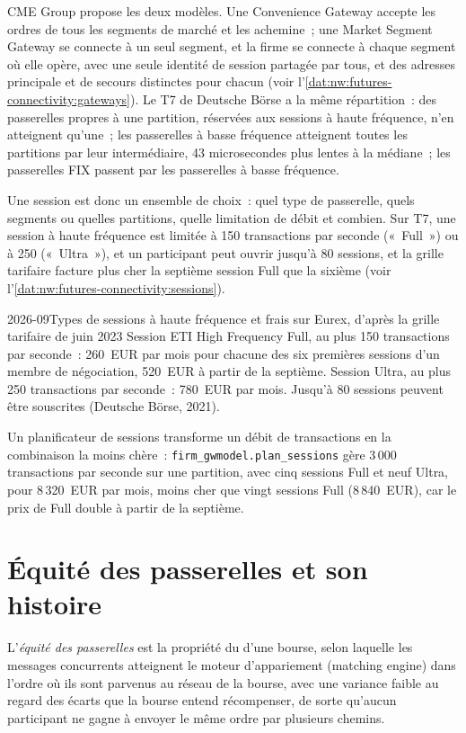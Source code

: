 CME Group propose les deux modèles. Une Convenience Gateway accepte les ordres de tous les segments de marché et les achemine~; une Market Segment
Gateway se connecte à un seul segment, et la firme se connecte à chaque segment où elle opère, avec une seule identité de session partagée par
  tous, et des adresses principale et de secours distinctes pour chacun (voir l'\cref{dat:nw:futures-connectivity:gateways}). Le T7 de Deutsche Börse
a la même répartition~: des passerelles propres à une partition, réservées aux sessions à haute fréquence, n'en atteignent qu'une~; les passerelles à basse fréquence
atteignent toutes les partitions par leur intermédiaire, 43 microsecondes plus lentes à la médiane~; les passerelles FIX passent par les passerelles à basse fréquence.

Une session est donc un ensemble de choix~: quel type de passerelle, quels segments ou quelles partitions, quelle limitation de débit et combien. Sur
T7, une session à haute fréquence est limitée à 150 transactions par seconde («~Full~») ou à 250 («~Ultra~»), et un participant peut ouvrir jusqu'à
80 sessions, et la grille tarifaire facture plus cher la septième session Full que la sixième
(voir l'\cref{dat:nw:futures-connectivity:sessions}).

\begin{dated}{2026-09}{Types de sessions à haute fréquence et frais sur Eurex, d'après la grille tarifaire de juin 2023}\label{dat:nw:futures-connectivity:sessions}
Session ETI High Frequency Full, au plus 150 transactions par seconde~: 260~EUR par mois pour chacune des six premières sessions
d'un membre de négociation, 520~EUR à partir de la septième. Session Ultra, au plus 250 transactions par seconde~: 780~EUR par mois. Jusqu'à 80 sessions peuvent être
souscrites (Deutsche Börse, 2021).
\end{dated}

Un planificateur de sessions transforme un débit de transactions en la combinaison la moins chère~: \texttt{firm\_gwmodel.plan\_sessions} gère 3\,000
transactions par seconde sur une partition, avec cinq sessions Full et neuf Ultra, pour 8\,320~EUR par mois, moins cher que vingt
sessions Full (8\,840~EUR), car le prix de Full double à partir de la septième.

\section{Équité des passerelles et son histoire}

\begin{definition}\label{def:nw:futures-connectivity:fairness}
L'\emph{équité des passerelles} est la propriété du  d'une bourse, selon laquelle les messages concurrents atteignent
le moteur d'appariement (matching engine) dans l'ordre où ils sont parvenus au réseau de la bourse, avec une variance faible
au regard des écarts que la bourse entend récompenser, de sorte qu'aucun participant ne gagne à envoyer le même ordre par plusieurs chemins.
\end{definition}


